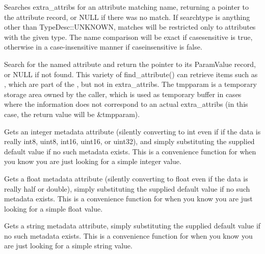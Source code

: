 Searches {\cf extra_attribs} for an attribute matching {\cf name},
returning a pointer to the attribute record, or NULL if there was no
match.  If {\cf searchtype} is anything other than {\cf TypeDesc::UNKNOWN},
matches will be restricted only to attributes with the given type.
The name comparison will be exact if {\cf casesensitive} is true, otherwise
in a case-insensitive manner if {\cf caseinsensitive} is false.
\apiend

Search for the named attribute and return the pointer to its
{\cf ParamValue} record, or {\cf NULL} if not found.  This variety of
{\cf find_attribute(}) can retrieve items such as , which are
part of the \ImageSpec, but not in {\cf extra_attribs}. The {\cf tmpparam}
is a temporary storage area owned by the caller, which is used as temporary
buffer in cases where the information does not correspond to an actual
{\cf extra_attribs} (in this case, the return value will be {\cf \&tmpparam}).
\apiend

Gets an integer metadata attribute (silently converting to {\cf int}
even if if the data is really int8, uint8, int16, uint16, or uint32),
and simply substituting the supplied default value if no such metadata
exists.  This is a convenience function for when you know you are just
looking for a simple integer value.
\apiend

Gets a float metadata attribute (silently converting to {\cf float} even
if the data is really half or double), simply substituting the supplied
default value if no such metadata exists.  This is a convenience
function for when you know you are just looking for a simple float value.
\apiend

Gets a string metadata attribute, simply substituting the supplied
default value if no such metadata exists.  This is a convenience
function for when you know you are just looking for a simple string value.
\apiend


